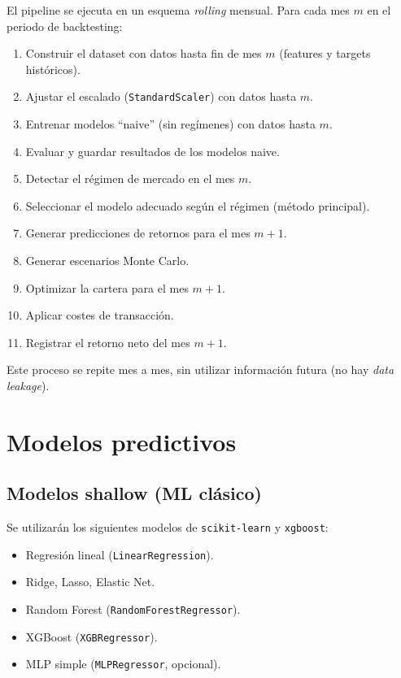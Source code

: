 \documentclass[12pt]{article}
\begin{document}
El pipeline se ejecuta en un esquema \textit{rolling} mensual. Para cada mes $m$ en el periodo de backtesting:

\begin{enumerate}
    \item Construir el dataset con datos hasta fin de mes $m$ (features y targets históricos).
    \item Ajustar el escalado (\texttt{StandardScaler}) con datos hasta $m$.
    \item Entrenar modelos ``naive'' (sin regímenes) con datos hasta $m$.
    \item Evaluar y guardar resultados de los modelos naive.
    \item Detectar el régimen de mercado en el mes $m$.
    \item Seleccionar el modelo adecuado según el régimen (método principal).
    \item Generar predicciones de retornos para el mes $m+1$.
    \item Generar escenarios Monte Carlo.
    \item Optimizar la cartera para el mes $m+1$.
    \item Aplicar costes de transacción.
    \item Registrar el retorno neto del mes $m+1$.
\end{enumerate}

Este proceso se repite mes a mes, sin utilizar información futura (no hay \textit{data leakage}).

\section{Modelos predictivos}

\subsection{Modelos shallow (ML clásico)}

Se utilizarán los siguientes modelos de \texttt{scikit-learn} y \texttt{xgboost}:

\begin{itemize}
    \item Regresión lineal (\texttt{LinearRegression}).
    \item Ridge, Lasso, Elastic Net.
    \item Random Forest (\texttt{RandomForestRegressor}).
    \item XGBoost (\texttt{XGBRegressor}).
    \item MLP simple (\texttt{MLPRegressor}, opcional).
\end{itemize}
\end{document}
